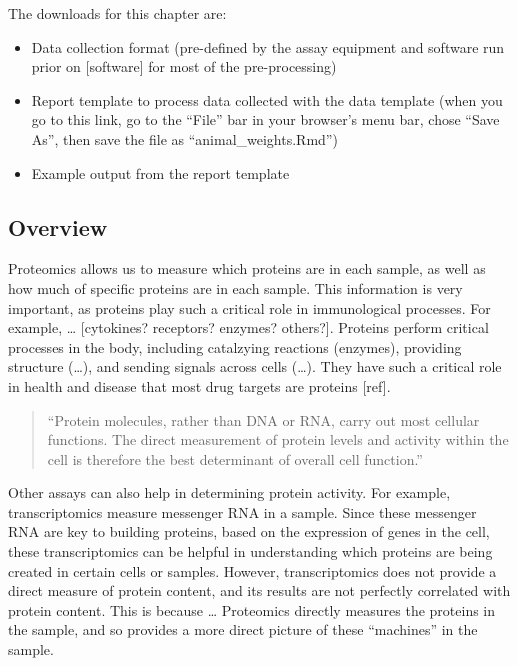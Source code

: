 \documentclass[
]{book}
\providecommand{\tightlist}{%
  \setlength{\itemsep}{0pt}\setlength{\parskip}{0pt}}
\begin{document}
The downloads for this chapter are:

\begin{itemize}
\tightlist
\item
  Data collection format (pre-defined by the assay equipment and software run
  prior on {[}software{]} for most of the pre-processing)
\item
  Report template to process data collected with the data template (when you go to this link, go to the ``File'' bar in your browser's menu bar, chose ``Save As'', then save the file as ``animal\_weights.Rmd'')
\item
  Example output from the report template
\end{itemize}

\hypertarget{overview-2}{%
\subsection{Overview}\label{overview-2}}

Proteomics allows us to measure which proteins are in each sample, as well
as how much of specific proteins are in each sample. This information is
very important, as proteins play such a critical role in immunological
processes. For example, \ldots{} {[}cytokines? receptors? enzymes? others?{]}.
Proteins perform critical processes in the body, including catalzying
reactions (enzymes), providing structure (\ldots), and sending signals across
cells (\ldots). They have such a critical role in health and disease that
most drug targets are proteins {[}ref{]}.

\begin{quote}
``Protein molecules, rather than DNA or RNA, carry out most cellular functions.
The direct measurement of protein levels and activity within the cell is
therefore the best determinant of overall cell function.''
\citep{lakhani2001microarray}
\end{quote}

Other assays can also help in determining protein activity. For example,
transcriptomics measure messenger RNA in a sample. Since these messenger
RNA are key to building proteins, based on the expression of genes in the
cell, these transcriptomics can be helpful in understanding which proteins
are being created in certain cells or samples. However, transcriptomics
does not provide a direct measure of protein content, and its results
are not perfectly correlated with protein content. This is because \ldots{}
Proteomics directly measures the proteins in the sample, and so provides
a more direct picture of these ``machines'' in the sample.
\end{document}

